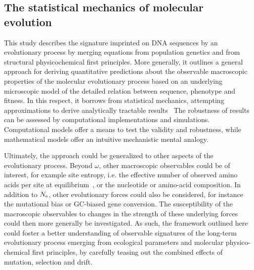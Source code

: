 \documentclass{article}
\begin{document}
\subsection{The statistical mechanics of molecular evolution}

This study describes the signature imprinted on DNA sequences by an evolutionary process by merging equations from population genetics and from structural physicochemical first principles. More generally, it outlines a general approach for deriving quantitative predictions about the observable macroscopic properties of the molecular evolutionary process based on an underlying microscopic model of the detailed relation between sequence, phenotype and fitness.
In this respect, it borrows from statistical mechanics, attempting approximations to derive analytically tractable results~\citep{Sella2005, Mustonen2009, Bastolla2012, Bastolla2017}
The robustness of results can be assessed by computational implementations and simulations. Computational models offer a means to test the validity and robustness, while mathematical models offer an intuitive mechanistic mental analogy.

Ultimately, the approach could be generalized to other aspects of the evolutionary process.
Beyond $\omega$, other macroscopic observables could be of interest, for example site entropy, i.e. the effective number of observed amino acids per site at equilibrium~\citep{Goldstein2016, Jimenez2018, Jiang2018}, or the nucleotide or amino-acid composition.
In addition to $N_{\text{e}}$, other evolutionary forces could also be considered, for instance the mutational bias or GC-biased gene conversion.
The susceptibility of the macroscopic observables to changes in the strength of these underlying forces could then more generally be investigated.
As such, the framework outlined here could foster a better understanding of observable signatures of the long-term evolutionary process emerging from ecological parameters and molecular physico-chemical first principles, by carefully teasing out the combined effects of mutation, selection and drift.
\end{document}
